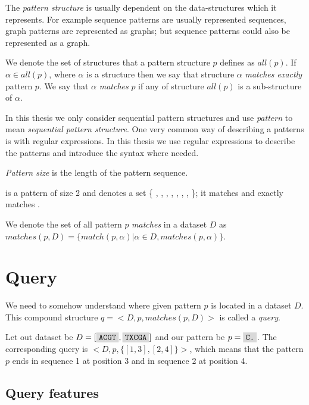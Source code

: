 The \emph{pattern structure} is usually dependent on the data-structures which it represents. For example sequence patterns are usually represented sequences, graph patterns are represented as graphs; but sequence patterns could also be represented as a graph.

We denote the set of structures that a pattern structure $p$ defines as $all(p)$. If $\alpha \in all(p)$, where $\alpha$ is a structure then we say that
structure $\alpha$ \emph{matches exactly} pattern $p$. We say that $\alpha$ \emph{matches} $p$ if any of structure $all(p)$ is a sub-structure of $\alpha$.

In this thesis we only consider sequential pattern structures and use \emph{pattern} to mean \emph{sequential pattern structure}. One very common way of describing a patterns is with regular expressions\cite{KleeneRegularSets,RegularExpressions}. In this thesis we use regular expressions to describe the patterns and introduce the syntax where needed.

\emph{Pattern size} is the length of the pattern sequence.

\begin{exmp}
 is a pattern of size 2 and denotes a set 
\{ , , , , , , , \}; it matches  and exactly matches .	
\end{exmp}

We denote the set of all pattern $p$ \emph{matches} in a dataset $D$ as $matches(p, D) = \{ match(p, \alpha) | \alpha \in D, matches(p, \alpha) \}$.

\section{Query}

We need to somehow understand where given pattern $p$ is located in a dataset $D$. This compound structure $q = <D, p, matches(p, D)>$ is called a \emph{query}.

\begin{exmp}
Let out dataset be $D = [ \text{\R{ACGT}}, \text{\R{TXCGA}} ]$ and our pattern be $p = \text{\R{C.}}$. The corresponding query is $<D, p, \{ [1,3], [2,4]\}>$, which means that the pattern $p$ ends in sequence 1 at position 3 and in sequence 2 at position 4.
\end{exmp}

\subsection{Query features}

